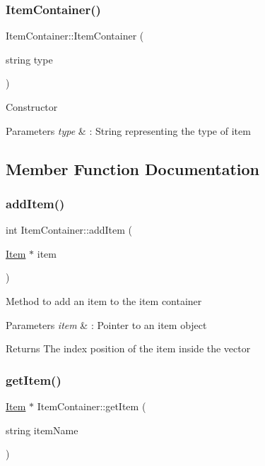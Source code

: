 \subsubsection{\texorpdfstring{Item\+Container()}{ItemContainer()}\hspace{0.1cm}{\footnotesize\ttfamily [2/2]}}
{\footnotesize\ttfamily Item\+Container\+::\+Item\+Container (\begin{DoxyParamCaption}\item[{string}]{type }\end{DoxyParamCaption})}

Constructor 
\begin{DoxyParams}{Parameters}
{\em type} & \+: String representing the type of item \\
\hline
\end{DoxyParams}


\subsection{Member Function Documentation}
\hypertarget{class_item_container_a1e96e332b6bb271ad81fc944f7b63f82}{}\label{class_item_container_a1e96e332b6bb271ad81fc944f7b63f82} 
\subsubsection{\texorpdfstring{add\+Item()}{addItem()}}
{\footnotesize\ttfamily int Item\+Container\+::add\+Item (\begin{DoxyParamCaption}\item[{\hyperlink{class_item}{Item} $\ast$}]{item }\end{DoxyParamCaption})}

Method to add an item to the item container 
\begin{DoxyParams}{Parameters}
{\em item} & \+: Pointer to an item object \\
\hline
\end{DoxyParams}
\begin{DoxyReturn}{Returns}
The index position of the item inside the vector 
\end{DoxyReturn}
\hypertarget{class_item_container_a69484fdd0e4b6511a53a9040bc65bd7e}{}\label{class_item_container_a69484fdd0e4b6511a53a9040bc65bd7e} 
\subsubsection{\texorpdfstring{get\+Item()}{getItem()}}
{\footnotesize\ttfamily \hyperlink{class_item}{Item} $\ast$ Item\+Container\+::get\+Item (\begin{DoxyParamCaption}\item[{string}]{item\+Name }\end{DoxyParamCaption})}

